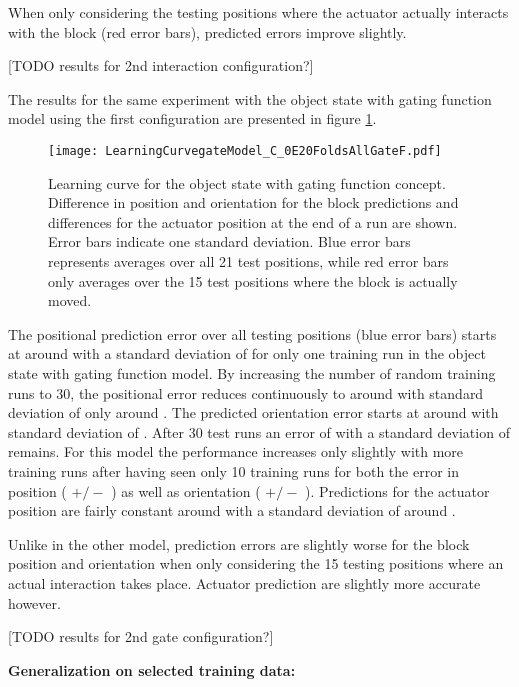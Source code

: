 When only considering the testing positions where the actuator actually interacts with the block (red error bars), predicted errors improve slightly.

[TODO results for 2nd interaction configuration?]

The results for the same experiment with the object state with gating function model using the first configuration are presented in figure \ref{fig:learnCurveGate1}.

\begin{figure}[h]
\centering
\texttt{[image: LearningCurvegateModel\_C\_0E20FoldsAllGateF.pdf]}
\caption{Learning curve for the object state with gating function concept. Difference in position and orientation for the block predictions and differences for the actuator position at the end of a run are shown. Error bars indicate one standard deviation. Blue error bars represents averages over all 21 test positions, while red error bars only averages over the 15 test positions where the block is actually moved.}
\label{fig:learnCurveGate1}
\end{figure}

The positional prediction error over all testing positions (blue error bars) starts at around  with a standard deviation of  for only one training run in the object state with gating function model. By increasing the number of random training runs to 30, the positional error reduces continuously to around  with standard deviation of only around .
The predicted orientation error starts at around  with standard deviation of .
After 30 test runs an error of  with a standard deviation of  remains.
For this model the performance increases only slightly with more training runs after having seen only 10 training runs for both the error in position ( $+/-$ ) as well as orientation ( $+/-$ ).
Predictions for the actuator position are fairly constant around  with a standard deviation of around .

Unlike in the other model, prediction errors are slightly worse for the block position and orientation when only considering the 15 testing positions where an actual interaction takes place. Actuator prediction are slightly more accurate however.

[TODO results for 2nd gate configuration?]


\textbf{Generalization on selected training data:}

